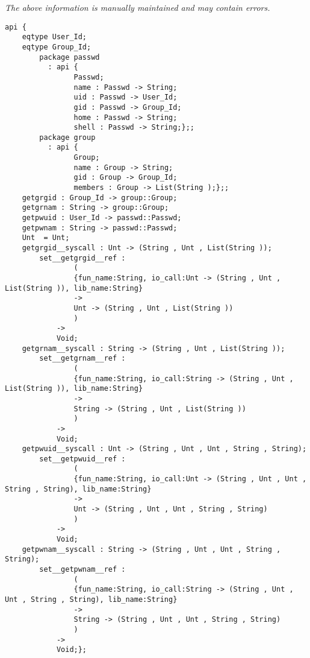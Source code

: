 \label{api:Posix\_Etc}

{\tiny \it The above information is manually maintained and may contain errors.}
\begin{verbatim}
api {
    eqtype User_Id;
    eqtype Group_Id;
        package passwd
          : api {
                Passwd;
                name : Passwd -> String;
                uid : Passwd -> User_Id;
                gid : Passwd -> Group_Id;
                home : Passwd -> String;
                shell : Passwd -> String;};;
        package group
          : api {
                Group;
                name : Group -> String;
                gid : Group -> Group_Id;
                members : Group -> List(String );};;
    getgrgid : Group_Id -> group::Group;
    getgrnam : String -> group::Group;
    getpwuid : User_Id -> passwd::Passwd;
    getpwnam : String -> passwd::Passwd;
    Unt  = Unt;
    getgrgid__syscall : Unt -> (String , Unt , List(String ));
        set__getgrgid__ref :
                (
                {fun_name:String, io_call:Unt -> (String , Unt , List(String )), lib_name:String}
                ->
                Unt -> (String , Unt , List(String ))
                )
            ->
            Void;
    getgrnam__syscall : String -> (String , Unt , List(String ));
        set__getgrnam__ref :
                (
                {fun_name:String, io_call:String -> (String , Unt , List(String )), lib_name:String}
                ->
                String -> (String , Unt , List(String ))
                )
            ->
            Void;
    getpwuid__syscall : Unt -> (String , Unt , Unt , String , String);
        set__getpwuid__ref :
                (
                {fun_name:String, io_call:Unt -> (String , Unt , Unt , String , String), lib_name:String}
                ->
                Unt -> (String , Unt , Unt , String , String)
                )
            ->
            Void;
    getpwnam__syscall : String -> (String , Unt , Unt , String , String);
        set__getpwnam__ref :
                (
                {fun_name:String, io_call:String -> (String , Unt , Unt , String , String), lib_name:String}
                ->
                String -> (String , Unt , Unt , String , String)
                )
            ->
            Void;};
\end{verbatim}

